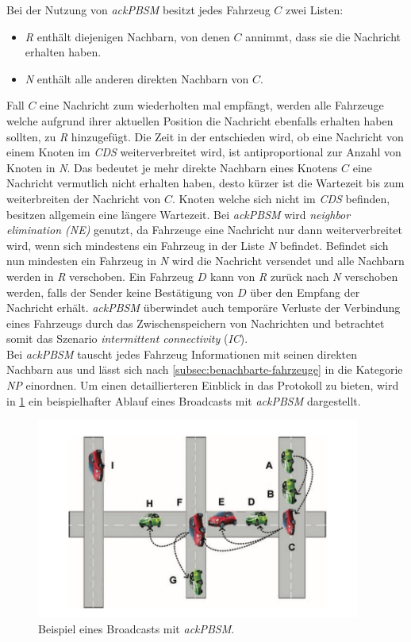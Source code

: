 \documentclass[english,runningheads,a4paper]{llncs}[2018/03/10]
\begin{document}
Bei der Nutzung von \textit{ackPBSM} besitzt jedes Fahrzeug $C$ zwei Listen:
\begin{itemize}
  \item \textit{R} enthält diejenigen Nachbarn, von denen $C$ annimmt, dass sie die Nachricht erhalten haben.
  \item \textit{N} enthält alle anderen direkten Nachbarn von $C$.
\end{itemize}
Fall $C$ eine Nachricht zum wiederholten mal empfängt, werden alle Fahrzeuge welche aufgrund ihrer aktuellen Position die Nachricht ebenfalls erhalten haben sollten, zu \textit{R} hinzugefügt.
Die Zeit in der entschieden wird, ob eine Nachricht von einem Knoten im \textit{CDS} weiterverbreitet wird, ist antiproportional zur Anzahl von Knoten in \textit{N}.
Das bedeutet je mehr direkte Nachbarn eines Knotens $C$ eine Nachricht vermutlich nicht erhalten haben, desto kürzer ist die Wartezeit bis zum weiterbreiten der Nachricht von $C$.
Knoten welche sich nicht im \textit{CDS} befinden, besitzen allgemein eine längere Wartezeit.
Bei \textit{ackPBSM} wird \textit{neighbor elimination (NE)} genutzt, da Fahrzeuge eine Nachricht nur dann weiterverbreitet wird, wenn sich mindestens ein Fahrzeug in der Liste \textit{N} befindet.
Befindet sich nun mindesten ein Fahrzeug in \textit{N} wird die Nachricht versendet und alle Nachbarn werden in \textit{R} verschoben.
Ein Fahrzeug $D$ kann von \textit{R} zurück nach \textit{N} verschoben werden, falls der Sender keine Bestätigung von $D$ über den Empfang der Nachricht erhält.
\textit{ackPBSM} überwindet auch temporäre Verluste der Verbindung eines Fahrzeugs durch das Zwischenspeichern von Nachrichten und betrachtet somit das Szenario \textit{intermittent connectivity} (\textit{IC})\cite{conti2013mobile}.\\
Bei \textit{ackPBSM} tauscht jedes Fahrzeug Informationen mit seinen direkten Nachbarn aus und lässt sich nach \ref{subsec:benachbarte-fahrzeuge} in die Kategorie \textit{NP} einordnen.
Um einen detaillierteren Einblick in das Protokoll zu bieten, wird in \ref{fig:ackpbsm-example} ein beispielhafter Ablauf eines Broadcasts mit \textit{ackPBSM} dargestellt.

\begin{figure}[h]
  \centering
  \includegraphics[width=0.95\textwidth]{images/ackpbsm-example.png}
  \caption{Beispiel eines Broadcasts mit \textit{ackPBSM}\cite{conti2013mobile}.}
  \label{fig:ackpbsm-example}
\end{figure}
\end{document}
